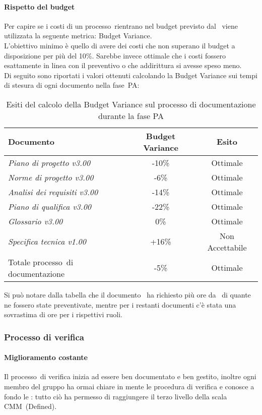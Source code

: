 \documentclass[../PianoDiQualifica.tex]{subfiles}
\begin{document}
\begin{appendices}
			\paragraph{Rispetto del budget}
			Per capire se i costi di un processo\g\ rientrano nel budget previsto dal \pianodiprogetto\ viene utilizzata la seguente metrica: Budget Variance.\\
			L'obiettivo minimo è quello di avere dei costi che non superano il budget a disposizione per più del 10\%. Sarebbe invece ottimale che i costi fossero esattamente in linea con il preventivo o che addirittura si avesse speso meno.\\
			Di seguito sono riportati i valori ottenuti calcolando la Budget Variance sui tempi di stesura di ogni documento nella fase\g\ PA:
			\begin{table}[H]
				\centering
				\begin{tabular}{l * {2}{c}}
					\toprule
					\textbf{Documento} & \textbf{Budget Variance} & \textbf{Esito} \\
					\midrule
					\textit{Piano di progetto v3.00} & -10\% &  Ottimale \\
					\textit{Norme di progetto v3.00} & -6\% & Ottimale \\
					\textit{Analisi dei requisiti v3.00} & -14\% & Ottimale \\
					\textit{Piano di qualifica v3.00} & -22\% & Ottimale \\
					\textit{Glossario v3.00} & 0\% & Ottimale \\
					\textit{Specifica tecnica v1.00} & +16\% & Non Accettabile \\
					Totale processo\g\ di documentazione & -5\% & Ottimale \\
					\bottomrule
				\end{tabular}
				\caption{Esiti del calcolo della Budget Variance sul processo di documentazione durante la fase PA}
				\label{tab:esiti_budget_variance}
			\end{table}
			 Si può notare dalla tabella che il documento \specificatecnica\ ha richiesto più ore da \progettista\ di quante ne fossero state preventivate, mentre per i restanti documenti c'è stata una sovrastima di ore per i rispettivi ruoli.
						
		\subsubsection{Processo di verifica}
			\paragraph{Miglioramento costante}
			Il processo\g\ di verifica inizia ad essere ben documentato e ben gestito, inoltre ogni membro del gruppo ha ormai chiare in mente le procedura di verifica e conosce a fondo le \normediprogetto: tutto ciò ha permesso di raggiungere il terzo livello della scala CMM\g\ (Defined).
			

\end{appendices}
\end{document}
